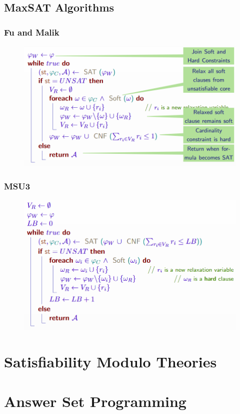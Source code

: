 \documentclass[10pt,a4paper]{report}
\begin{document}
\section{MaxSAT Algorithms}
\subsection{Fu and Malik}
\begin{figure}[H]
    \centering
    \includegraphics[scale=0.5]{10.png}
\end{figure}
\subsection{MSU3}
\begin{figure}[H]
    \centering
    \includegraphics[scale=0.5]{11.png}
\end{figure}

\chapter{Satisfiability Modulo Theories}
\chapter{Answer Set Programming}
\end{document}
